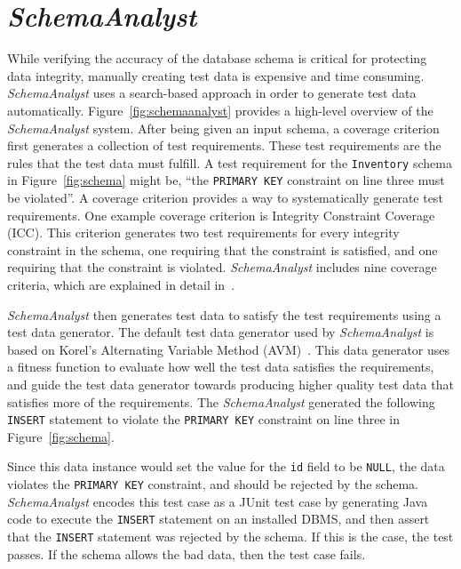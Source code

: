 \section{\textit{SchemaAnalyst}}\label{sec:technique}

While verifying the accuracy of the database schema is critical for protecting data integrity, manually
creating test data is expensive and time consuming. \textit{SchemaAnalyst} uses a search-based
approach in order to generate test data automatically. Figure~\ref{fig:schemaanalyst} provides a
high-level overview of the \textit{SchemaAnalyst} system.
After being given an input schema, a coverage criterion first generates a collection of test 
requirements. These test requirements are the rules that
the test data must fulfill. A test requirement for the \texttt{Inventory} schema in
Figure~\ref{fig:schema} might be, ``the \texttt{PRIMARY KEY} constraint on line three must be
violated''. A coverage criterion provides a way to systematically generate test requirements. One
example coverage criterion is Integrity Constraint Coverage (ICC). This criterion generates two test
requirements for every integrity constraint in the schema, one requiring that the constraint is
satisfied, and one requiring that the constraint is violated. \textit{SchemaAnalyst} includes nine
coverage criteria, which are explained in detail in~\cite{mcminn2015effectiveness}.

\textit{SchemaAnalyst} then generates test data
to satisfy the test requirements using a test data generator. The default test data generator used by
\textit{SchemaAnalyst} is based on Korel's Alternating Variable Method (AVM)~\cite{Korel:AVM}.
This data generator uses a fitness function to evaluate how well the test data satisfies the
requirements, and guide the test data generator towards producing higher quality test data that
satisfies more of the requirements. The \textit{SchemaAnalyst} generated the following \texttt{INSERT}
statement to violate the \texttt{PRIMARY KEY} constraint on line three in Figure~\ref{fig:schema}.



Since this data instance would set the value for the \texttt{id} field to be \texttt{NULL},
the data violates the \texttt{PRIMARY KEY} constraint, and should be rejected by the schema.
\textit{SchemaAnalyst} encodes this test case as a JUnit test case by generating Java code to execute
the \texttt{INSERT} statement on an installed DBMS, and then assert that the \texttt{INSERT} statement
was rejected by the schema. If this is the case, the test passes.  If the schema allows the bad data,
then the test case fails.

